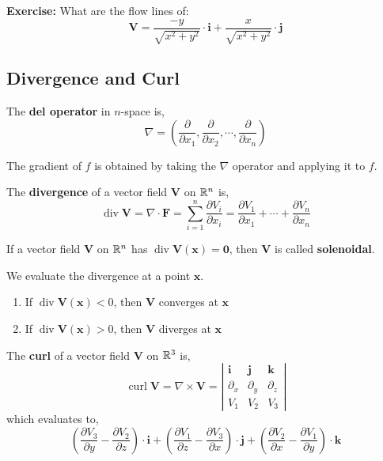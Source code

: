 \begin{marginfigure}
	\textbf{Exercise: } What are the flow lines of:
	\[\mathbf{V} = \frac{-y}{\sqrt{x^2+y^2}} \cdot \mathbf{i}+\frac{x}{\sqrt{x^2+y^2}} \cdot \mathbf{j}\]
\end{marginfigure}

\subsection{Divergence and Curl}
\begin{defn}[$\nabla$]
	The \textbf{del operator} in $n$-space is,
	\[\nabla=\left(\frac{\partial}{\partial x_1}, \frac{\partial}{\partial x_2}, \cdots, \frac{\partial}{\partial x_n}\right)\]
\end{defn}

\begin{marginfigure}
	The gradient of $f$ is obtained by taking the $\nabla$ operator and applying it to $f$.
\end{marginfigure}

\begin{defn}
	\sloppy The \textbf{divergence} of a vector field $\mathbf{V}$ on $\mathbb{R}^n$ is,
	\[\operatorname{div} \mathbf{V}= \nabla \cdot \mathbf{F} = \sum_{i=1}^n \frac{\partial V_i}{\partial x_i}=\frac{\partial V_1}{\partial x_1}+\cdots+\frac{\partial V_n}{\partial x_n}\]
\end{defn}

\begin{defn}[Solenoidal]
	If a vector field $\mathbf{V}$ on $\mathbb{R}^n$ has $\operatorname{div} \mathbf{V}(\mathbf{x}) = \mathbf{0}$, then $\mathbf{V}$ is called \textbf{solenoidal}.
\end{defn}

\begin{rmk}
	We evaluate the divergence at a point $\mathbf{x}$. 
	\begin{enumerate}
		\item If $\operatorname{div} \mathbf{V}(\mathbf{x}) < 0$, then $\mathbf{V}$ converges at $\mathbf{x}$
		\item If $\operatorname{div} \mathbf{V}(\mathbf{x}) > 0$, then $\mathbf{V}$ diverges at $\mathbf{x}$
	\end{enumerate}
\end{rmk}

\begin{defn}
	The \textbf{curl} of a vector field $\mathbf{V}$ on $\mathbb{R}^3$ is,
	\[\operatorname{curl} \mathbf{V}=\nabla \times \mathbf{V}=\left|\begin{array}{ccc}
	\mathbf{i} & \mathbf{j} & \mathbf{k} \\
	\partial_x & \partial_y & \partial_z \\
	V_1 & V_2 & V_3
	\end{array}\right|\]
	which evaluates to,
	\[\left(\frac{\partial V_3}{\partial y}-\frac{\partial V_2}{\partial z}\right) \cdot \mathbf{i}+\left(\frac{\partial V_1}{\partial z}-\frac{\partial V_3}{\partial x}\right) \cdot \mathbf{j}+\left(\frac{\partial V_2}{\partial x}-\frac{\partial V_1}{\partial y}\right) \cdot \mathbf{k}\]
\end{defn}

